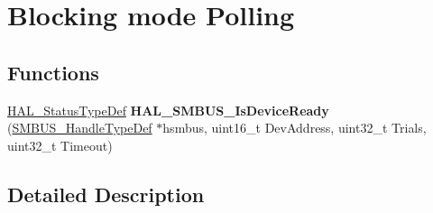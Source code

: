 \hypertarget{group___blocking__mode___polling}{}\section{Blocking mode Polling}
\label{group___blocking__mode___polling}
\subsection*{Functions}
\begin{DoxyCompactItemize}
\item 
\mbox{\label{group___blocking__mode___polling_gad1abc80d85c0e0fd9fa0ea66cc700321}} 
\hyperlink{stm32f0xx__hal__def_8h_a63c0679d1cb8b8c684fbb0632743478f}{H\+A\+L\+\_\+\+Status\+Type\+Def} {\bfseries H\+A\+L\+\_\+\+S\+M\+B\+U\+S\+\_\+\+Is\+Device\+Ready} (\hyperlink{struct_s_m_b_u_s___handle_type_def}{S\+M\+B\+U\+S\+\_\+\+Handle\+Type\+Def} $\ast$hsmbus, uint16\+\_\+t Dev\+Address, uint32\+\_\+t Trials, uint32\+\_\+t Timeout)
\end{DoxyCompactItemize}


\subsection{Detailed Description}
